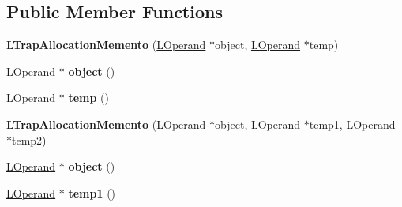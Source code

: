 \subsection*{Public Member Functions}
\begin{DoxyCompactItemize}
\item 
{\bfseries L\+Trap\+Allocation\+Memento} (\hyperlink{classv8_1_1internal_1_1_l_operand}{L\+Operand} $\ast$object, \hyperlink{classv8_1_1internal_1_1_l_operand}{L\+Operand} $\ast$temp)\hypertarget{classv8_1_1internal_1_1_l_trap_allocation_memento_ac6bcdec1f1e7643e817440c9c13e4a81}{}\label{classv8_1_1internal_1_1_l_trap_allocation_memento_ac6bcdec1f1e7643e817440c9c13e4a81}

\item 
\hyperlink{classv8_1_1internal_1_1_l_operand}{L\+Operand} $\ast$ {\bfseries object} ()\hypertarget{classv8_1_1internal_1_1_l_trap_allocation_memento_a8cf93b74c7f72372724621e5c5cfeb06}{}\label{classv8_1_1internal_1_1_l_trap_allocation_memento_a8cf93b74c7f72372724621e5c5cfeb06}

\item 
\hyperlink{classv8_1_1internal_1_1_l_operand}{L\+Operand} $\ast$ {\bfseries temp} ()\hypertarget{classv8_1_1internal_1_1_l_trap_allocation_memento_ac4ad07a7d7d3bf7ca3285e47cbaed844}{}\label{classv8_1_1internal_1_1_l_trap_allocation_memento_ac4ad07a7d7d3bf7ca3285e47cbaed844}

\item 
{\bfseries L\+Trap\+Allocation\+Memento} (\hyperlink{classv8_1_1internal_1_1_l_operand}{L\+Operand} $\ast$object, \hyperlink{classv8_1_1internal_1_1_l_operand}{L\+Operand} $\ast$temp1, \hyperlink{classv8_1_1internal_1_1_l_operand}{L\+Operand} $\ast$temp2)\hypertarget{classv8_1_1internal_1_1_l_trap_allocation_memento_af868ce1954e680022b888601b23cfd3c}{}\label{classv8_1_1internal_1_1_l_trap_allocation_memento_af868ce1954e680022b888601b23cfd3c}

\item 
\hyperlink{classv8_1_1internal_1_1_l_operand}{L\+Operand} $\ast$ {\bfseries object} ()\hypertarget{classv8_1_1internal_1_1_l_trap_allocation_memento_a8cf93b74c7f72372724621e5c5cfeb06}{}\label{classv8_1_1internal_1_1_l_trap_allocation_memento_a8cf93b74c7f72372724621e5c5cfeb06}

\item 
\hyperlink{classv8_1_1internal_1_1_l_operand}{L\+Operand} $\ast$ {\bfseries temp1} ()\hypertarget{classv8_1_1internal_1_1_l_trap_allocation_memento_a51d584ab8772f64908e948bc583e89aa}{}\label{classv8_1_1internal_1_1_l_trap_allocation_memento_a51d584ab8772f64908e948bc583e89aa}


\end{DoxyCompactItemize}
